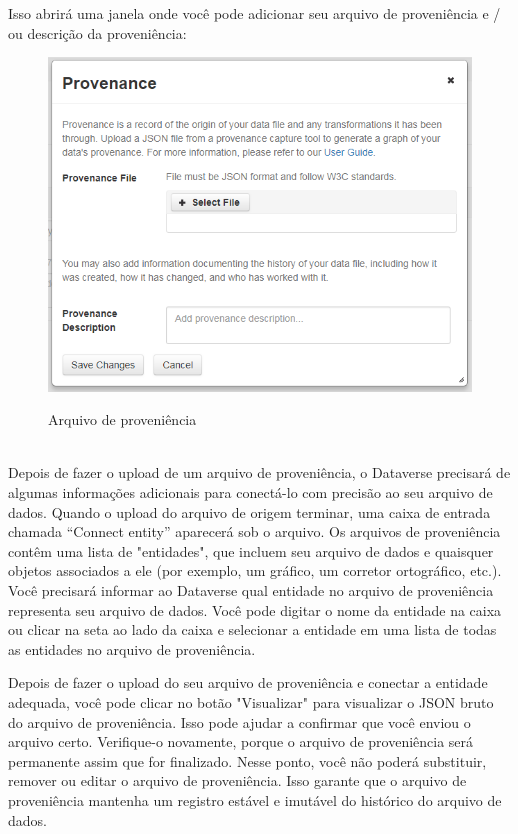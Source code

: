 \documentclass[12pt,hidelinks]{article}
\begin{document}
Isso abrirá uma janela onde você pode adicionar seu arquivo de proveniência e / ou descrição da proveniência:
    
 \begin{figure}[H]
                 \caption{Arquivo de proveniência}
                \centering                \includegraphics[scale=0.7]{prov1.png}
            \label{Proveniência1}
        \end{figure}
\\

Depois de fazer o upload de um arquivo de proveniência, o Dataverse precisará de algumas informações adicionais para conectá-lo com precisão ao seu arquivo de dados. Quando o upload do arquivo de origem terminar, uma caixa de entrada chamada “Connect entity” aparecerá sob o arquivo. Os arquivos de proveniência contêm uma lista de "entidades", que incluem seu arquivo de dados e quaisquer objetos associados a ele (por exemplo, um gráfico, um corretor ortográfico, etc.). Você precisará informar ao Dataverse qual entidade no arquivo de proveniência representa seu arquivo de dados. Você pode digitar o nome da entidade na caixa ou clicar na seta ao lado da caixa e selecionar a entidade em uma lista de todas as entidades no arquivo de proveniência.

Depois de fazer o upload do seu arquivo de proveniência e conectar a entidade adequada, você pode clicar no botão "Visualizar" para visualizar o JSON bruto do arquivo de proveniência. Isso pode ajudar a confirmar que você enviou o arquivo certo. Verifique-o novamente, porque o arquivo de proveniência será permanente assim que for finalizado. Nesse ponto, você não poderá substituir, remover ou editar o arquivo de proveniência. Isso garante que o arquivo de proveniência mantenha um registro estável e imutável do histórico do arquivo de dados. 
\end{document}
